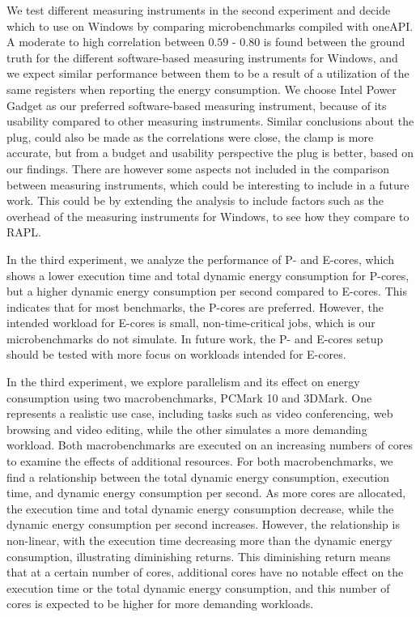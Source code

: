 
We test different measuring instruments in the second experiment and decide which to use on Windows by comparing microbenchmarks compiled with oneAPI. A moderate to high correlation between $0.59$ - $0.80$ is found between the ground truth for the different software-based measuring instruments for Windows, and we expect similar performance between them to be a result of a utilization of the same registers when reporting the energy consumption. We choose Intel Power Gadget as our preferred software-based measuring instrument, because of its usability compared to other measuring instruments. Similar conclusions about the plug, could also be made as the correlations were close, the clamp is more accurate, but from a budget and usability perspective the plug is better, based on our findings. There are however some aspects not included in the comparison between measuring instruments, which could be interesting to include in a future work. This could be by extending the analysis to include factors such as the overhead of the measuring instruments for Windows, to see how they compare to RAPL.

In the third experiment, we analyze the performance of P- and E-cores, which shows a lower execution time and total dynamic energy consumption for P-cores, but a higher dynamic energy consumption per second compared to E-cores. This indicates that for most benchmarks, the P-cores are preferred. However, the intended workload for E-cores is small, non-time-critical jobs, which is our microbenchmarks do not simulate. In future work, the P- and E-cores setup should be tested with more focus on workloads intended for E-cores.

In the third experiment, we explore parallelism and its effect on energy consumption using two macrobenchmarks, PCMark 10 and 3DMark. One represents a realistic use case, including tasks such as video conferencing, web browsing and video editing, while the other simulates a more demanding workload. Both macrobenchmarks are executed on an increasing numbers of cores to examine the effects of additional resources. For both macrobenchmarks, we find a relationship between the total dynamic energy consumption, execution time, and dynamic energy consumption per second. As more cores are allocated, the execution time and total dynamic energy consumption decrease, while the dynamic energy consumption per second increases. However, the relationship is non-linear, with the execution time decreasing more than the dynamic energy consumption, illustrating diminishing returns. This diminishing return means that at a certain number of cores, additional cores have no notable effect on the execution time or the total dynamic energy consumption, and this number of cores is expected to be higher for more demanding workloads.

